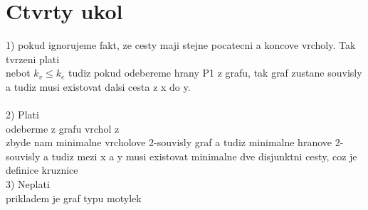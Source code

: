 \documentclass[a4paper]{article}
\begin{document}
\section*{Ctvrty ukol}
1) pokud ignorujeme fakt, ze cesty maji stejne pocatecni a koncove vrcholy.
Tak tvrzeni plati\\
nebot $k_v \leq k_e$ tudiz pokud odebereme hrany P1
z grafu, tak graf zustane souvisly a tudiz musi existovat dalsi cesta z x do y.\\
\\
2) Plati\\
odeberme z grafu vrchol z\\
zbyde nam minimalne vrcholove 2-souvisly graf a tudiz minimalne hranove 2-souvisly a tudiz mezi x a y musi existovat minimalne dve disjunktni cesty, coz je definice kruznice
\\
3) Neplati\\
prikladem je graf typu motylek\\
\end{document}
